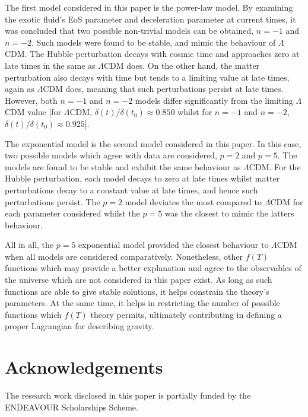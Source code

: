 \documentclass[prl,floatfix,showpacs,twocolumn,preprintnumbers,amsmath,amssymb,superscriptaddress]{revtex4}
\begin{document}
The first model considered in this paper is the power-law model. By examining the exotic fluid's EoS parameter and deceleration parameter at current times, it was concluded that two possible non-trivial models can be obtained, $n = -1$ and $n = -2$. Such models were found to be stable, and mimic the behaviour of $\Lambda$CDM. The Hubble perturbation decays with cosmic time and approaches zero at late times in the same as $\Lambda$CDM does. On the other hand, the matter perturbation also decays with time but tends to a limiting value at late times, again as $\Lambda$CDM does, meaning that such perturbations persist at late times. However, both $n = -1$ and $n = -2$ models differ significantly from the limiting $\Lambda$CDM value [for $\Lambda$CDM, $\delta(t)/\delta\left(t_0\right) \approx 0.850$ whilst for $n = -1$ and $n = -2$, $\delta(t)/\delta\left(t_0\right) \approx 0.925$].

The exponential model is the second model considered in this paper. In this case, two possible models which agree with data are considered, $p = 2$ and $p = 5$. The models are found to be stable and exhibit the same behaviour as $\Lambda$CDM. For the Hubble perturbation, each model decays to zero at late times whilst matter perturbations decay to a constant value at late times, and hence such perturbations persist. The $p = 2$ model deviates the most compared to $\Lambda$CDM for each parameter considered whilst the $p = 5$ was the closest to mimic the latters behaviour.

All in all, the $p = 5$ exponential model provided the closest behaviour to $\Lambda$CDM when all models are considered comparatively. Nonetheless, other $f(T)$ functions which may provide a better explanation and agree to the observables of the universe which are not considered in this paper exist. As long as such functions are able to give stable solutions, it helps constrain the theory's parameters. At the same time, it helps in restricting the number of possible functions which $f(T)$ theory permits, ultimately contributing in defining a proper Lagrangian for describing gravity.

\section*{Acknowledgements}

The research work disclosed in this paper is partially funded by the ENDEAVOUR Scholarships Scheme. 
\end{document}
